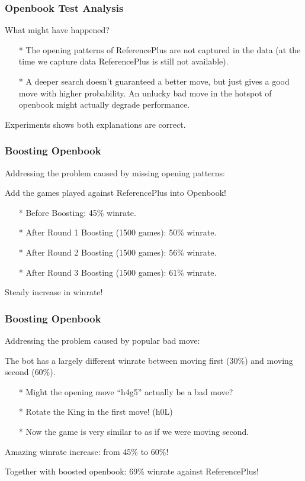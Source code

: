 \documentclass[10pt]{beamer}
\begin{document}
	\begin{frame}
		\frametitle{Openbook Test Analysis}

		What might have happened?

		\begin{itemize}
		\item[*] The opening patterns of ReferencePlus are not captured in the data
		(at the time we capture data ReferencePlus is still not available).
		\item[*] A deeper search doesn't guaranteed a better move, but just gives a good move with higher probability.
		An unlucky bad move in the hotspot of openbook might actually degrade performance.
		\end{itemize}

		Experiments shows \textcolor{fgreen}{both} explanations are correct.
	\end{frame}

	\begin{frame}
		\frametitle{Boosting Openbook}

		Addressing the problem caused by missing opening patterns:

		\textcolor{fgreen}{Add the games played against ReferencePlus into Openbook!}

		\begin{itemize}
		\item[*] Before Boosting: \textcolor{dred}{45\%} winrate.
		\item[*] After Round 1 Boosting (1500 games): \textcolor{fgreen}{50\%} winrate.
		\item[*] After Round 2 Boosting (1500 games): \textcolor{fgreen}{56\%} winrate.
		\item[*] After Round 3 Boosting (1500 games): \textcolor{fgreen}{61\%} winrate.
		\end{itemize}

		Steady increase in winrate!
	\end{frame}

	\begin{frame}
		\frametitle{Boosting Openbook}

		Addressing the problem caused by popular bad move:

		The bot has a largely different winrate between moving first (\textcolor{dred}{30\%}) and moving second (\textcolor{fgreen}{60\%}).

		\begin{itemize}
		\item[*] Might the opening move ``h4g5'' actually be a bad move?
		\item[*] Rotate the King in the first move! (h0L)
		\item[*] Now the game is very similar to as if we were moving second.
		\end{itemize}

		Amazing winrate increase: from \textcolor{dred}{45\%} to \textcolor{fgreen}{60\%}!

		Together with boosted openbook: \textcolor{fgreen}{69\%} winrate against ReferencePlus!
	\end{frame}
\end{document}
